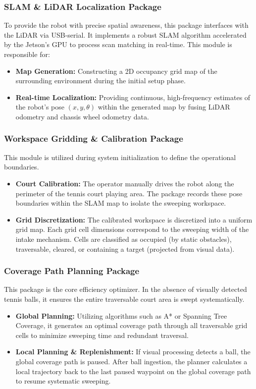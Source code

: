 \subsubsection{SLAM \& LiDAR Localization Package}
\label{sec:slam}
To provide the robot with precise spatial awareness, this package interfaces with the LiDAR via USB-serial. It implements a robust SLAM algorithm accelerated by the Jetson's GPU to process scan matching in real-time. This module is responsible for:
\begin{itemize}
  \item \textbf{Map Generation:} Constructing a 2D occupancy grid map of the surrounding environment during the initial setup phase.
  \item \textbf{Real-time Localization:} Providing continuous, high-frequency estimates of the robot's pose $(x, y, \theta)$ within the generated map by fusing LiDAR odometry and chassis wheel odometry data.
\end{itemize}

\subsubsection{Workspace Gridding \& Calibration Package}
\label{sec:gridding}
This module is utilized during system initialization to define the operational boundaries.
\begin{itemize}
  \item \textbf{Court Calibration:} The operator manually drives the robot along the perimeter of the tennis court playing area. The package records these pose boundaries within the SLAM map to isolate the sweeping workspace.
  \item \textbf{Grid Discretization:} The calibrated workspace is discretized into a uniform grid map. Each grid cell dimensions correspond to the sweeping width of the intake mechanism. Cells are classified as occupied (by static obstacles), traversable, cleared, or containing a target (projected from visual data).
\end{itemize}

\subsubsection{Coverage Path Planning Package}
\label{sec:path-planning}
This package is the core efficiency optimizer. In the absence of visually detected tennis balls, it ensures the entire traversable court area is swept systematically.
\begin{itemize}
  \item \textbf{Global Planning:} Utilizing algorithms such as A* or Spanning Tree Coverage, it generates an optimal coverage path through all traversable grid cells to minimize sweeping time and redundant traversal.
  \item \textbf{Local Planning \& Replenishment:} If visual processing detects a ball, the global coverage path is paused. After ball ingestion, the planner calculates a local trajectory back to the last paused waypoint on the global coverage path to resume systematic sweeping.
\end{itemize}

